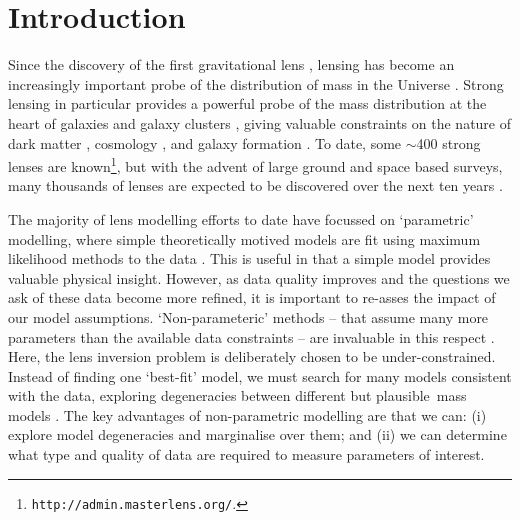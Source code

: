 \documentclass[galley,usenatbib]{mn2e}
\begin{document}
\section{Introduction}\label{sec:intro} %
Since the discovery of the first gravitational lens
\citep{1979Natur.279..381W}, lensing has become an increasingly important probe
of the distribution of mass in the Universe
\citep{1937ApJ....86..217Z,2012arXiv1206.1225A}. Strong lensing in particular 
provides a powerful probe of the mass distribution at the heart of galaxies and
galaxy clusters \citep{2010CQGra..27w3001B,2007ApJ...667..645R,2006ApJ...652L...5S,2009ApJ...690..154S}, giving valuable constraints on the nature of dark matter \citep{2006ApJ...652L...5S,2013ApJ...765...25N}, cosmology 
\citep{2010Sci...329..924J, 2008ApJ...679...17C}, and galaxy formation \citep{2012MNRAS.424..104L}. To date, some $\sim$400 strong lenses are
known\footnote{{\tt http://admin.masterlens.org/}.}, but with the advent of
large ground and space based surveys, many thousands of lenses are expected to
be discovered over the next ten years \citep{2012arXiv1206.1225A,
2010AAS...21540115M, 2004NewAR..48.1085K}.

The majority of lens modelling efforts to date have focussed on `parametric'
modelling, where simple theoretically motived models are fit using maximum
likelihood methods to the data \citep{2011A&ARv..19...47K, 1993A&A...273..367K,
2010GReGr..42.2151K}. This is useful in that a simple model provides valuable
physical insight. However, as data quality improves and the questions we ask of
these data become more refined, it is important to re-asses the impact of our
model assumptions. `Non-parameteric' methods -- that assume many more
parameters than the available data constraints -- are invaluable in this
respect \citep{1997MNRAS.292..148S,2005MNRAS.360..477D,2010ApJ...723.1678C,2006MNRAS.367.1209L,2013arXiv1304.2393S}. Here, the lens inversion problem is
deliberately chosen to be under-constrained.
Instead of finding one `best-fit' model, we must search for many models
consistent with the data, exploring degeneracies between different but
plausible\footnotemark\ mass models
\citep{2000AJ....120.1654S,2006ApJ...653..936S,2008MNRAS.386..307L}. The key
advantages of non-parametric modelling are that we can: (i) explore model
degeneracies and marginalise over them; and (ii) we can determine what type and
quality of data are required to measure parameters of interest. 

\end{document}
